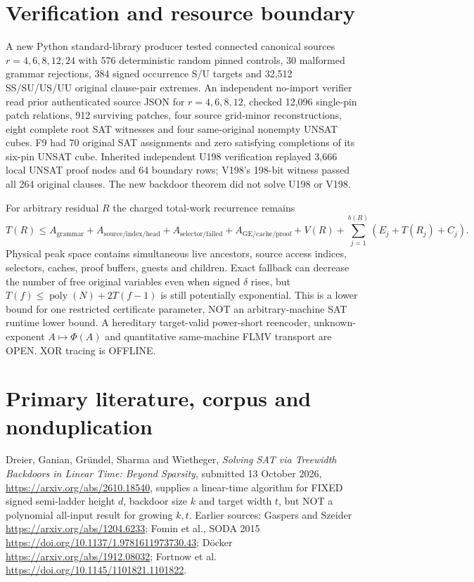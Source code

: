 \documentclass[11pt]{article}
\begin{document}
\section*{Verification and resource boundary}
A new Python standard-library producer tested connected canonical sources $r=4,6,8,12,24$ with 576 deterministic random pinned controls, 30 malformed grammar rejections, 384 signed occurrence S/U targets and 32,512 SS/SU/US/UU original clause-pair extremes. An independent no-import verifier read prior authenticated source JSON for $r=4,6,8,12$, checked 12,096 single-pin patch relations, 912 surviving patches, four source grid-minor reconstructions, eight complete root SAT witnesses and four same-original nonempty UNSAT cubes. F9 had 70 original SAT assignments and zero satisfying completions of its six-pin UNSAT cube. Inherited independent U198 verification replayed 3,666 local UNSAT proof nodes and 64 boundary rows; V198's 198-bit witness passed all 264 original clauses. The new backdoor theorem did not solve U198 or V198.

For arbitrary residual $R$ the charged total-work recurrence remains
\[
T(R)\le A_{\mathrm{grammar}}+A_{\mathrm{source/index/head}}+
 A_{\mathrm{selector/failed}}+A_{\mathrm{GE/cache/proof}}+V(R)
+\sum_{j=1}^{b(R)}(E_j+T(R_j)+C_j).
\]
Physical peak space contains simultaneous live ancestors, source access indices, selectors, caches, proof buffers, guests and children. Exact fallback can decrease the number of free original variables even when signed $\delta$ rises, but $T(f)\le\operatorname{poly}(N)+2T(f-1)$ is still potentially exponential. This is a lower bound for one restricted certificate parameter, NOT an arbitrary-machine SAT runtime lower bound. A hereditary target-valid power-short reencoder, unknown-exponent $A\mapsto\Phi(A)$ and quantitative same-machine FLMV transport are OPEN. XOR tracing is OFFLINE.

\section*{Primary literature, corpus and nonduplication}
Dreier, Ganian, Gr\"undel, Sharma and Wietheger, \emph{Solving SAT via Treewidth Backdoors in Linear Time: Beyond Sparsity}, submitted 13 October 2026, \url{https://arxiv.org/abs/2610.18540}, supplies a linear-time algorithm for FIXED signed semi-ladder height $d$, backdoor size $k$ and target width $t$, but NOT a polynomial all-input result for growing $k,t$. Earlier sources: Gaspers and Szeider \url{https://arxiv.org/abs/1204.6233}; Fomin et al., SODA 2015 \url{https://doi.org/10.1137/1.9781611973730.43}; D\"ocker \url{https://arxiv.org/abs/1912.08032}; Fortnow et al. \url{https://doi.org/10.1145/1101821.1101822}.
\end{document}
